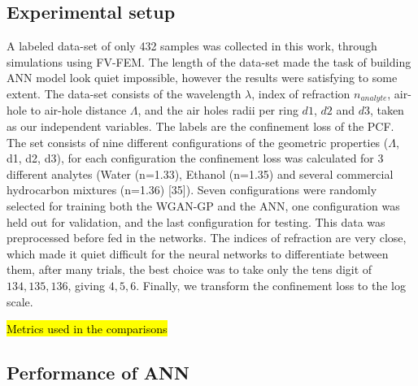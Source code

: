 \documentclass[draft, a4, 10pt, onecolumn]{IEEEtran}
\begin{document}
\subsection{Experimental setup}

A labeled data-set of only 432 samples was collected in this work, through simulations using FV-FEM. The length of the data-set made the task of building ANN model look quiet impossible, however the results were satisfying to some extent. The data-set consists of the wavelength $\lambda$, index of refraction $n_{analyte} $, air-hole to air-hole distance $ \Lambda $, and the air holes radii per ring $d1$, $d2$ and $d3$, taken as our independent variables. The labels are the confinement loss of the PCF. The set consists of nine different configurations of the geometric properties ($ \Lambda $, d1, d2, d3), for each configuration the confinement loss was calculated for 3 different analytes (Water (n=1.33), Ethanol (n=1.35) and several commercial hydrocarbon mixtures (n=1.36) [35]). Seven configurations were randomly selected for training both the WGAN-GP and the ANN, one configuration was held out for validation, and the last configuration for testing. This data was preprocessed before fed in the networks. The indices of refraction  are very close, which made it quiet difficult for the neural networks to differentiate between them, after many trials, the best choice was to take only the tens digit of ${134, 135, 136}$, giving ${4, 5, 6}$. Finally, we transform the confinement loss to the log scale.

\hl{Metrics used in the comparisons}


\subsection{Performance of ANN}
\end{document}
